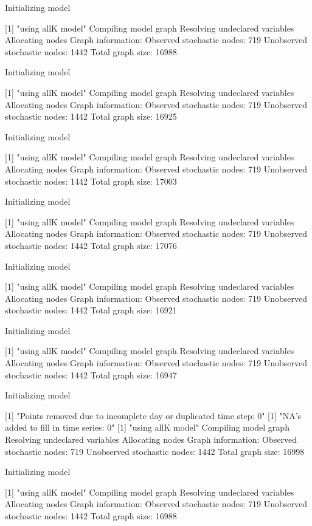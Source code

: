 \documentclass[11pt,lineno]{manuscript}\usepackage[]{graphicx}\usepackage[]{xcolor}
\begin{document}
Initializing model

[1] "using allK model"
Compiling model graph
   Resolving undeclared variables
   Allocating nodes
Graph information:
   Observed stochastic nodes: 719
   Unobserved stochastic nodes: 1442
   Total graph size: 16988

Initializing model

[1] "using allK model"
Compiling model graph
   Resolving undeclared variables
   Allocating nodes
Graph information:
   Observed stochastic nodes: 719
   Unobserved stochastic nodes: 1442
   Total graph size: 16925

Initializing model

[1] "using allK model"
Compiling model graph
   Resolving undeclared variables
   Allocating nodes
Graph information:
   Observed stochastic nodes: 719
   Unobserved stochastic nodes: 1442
   Total graph size: 17003

Initializing model

[1] "using allK model"
Compiling model graph
   Resolving undeclared variables
   Allocating nodes
Graph information:
   Observed stochastic nodes: 719
   Unobserved stochastic nodes: 1442
   Total graph size: 17076

Initializing model

[1] "using allK model"
Compiling model graph
   Resolving undeclared variables
   Allocating nodes
Graph information:
   Observed stochastic nodes: 719
   Unobserved stochastic nodes: 1442
   Total graph size: 16921

Initializing model

[1] "using allK model"
Compiling model graph
   Resolving undeclared variables
   Allocating nodes
Graph information:
   Observed stochastic nodes: 719
   Unobserved stochastic nodes: 1442
   Total graph size: 16947

Initializing model

[1] "Points removed due to incomplete day or duplicated time step: 0"
[1] "NA's added to fill in time series: 0"
[1] "using allK model"
Compiling model graph
   Resolving undeclared variables
   Allocating nodes
Graph information:
   Observed stochastic nodes: 719
   Unobserved stochastic nodes: 1442
   Total graph size: 16998

Initializing model

[1] "using allK model"
Compiling model graph
   Resolving undeclared variables
   Allocating nodes
Graph information:
   Observed stochastic nodes: 719
   Unobserved stochastic nodes: 1442
   Total graph size: 16988
\end{document}
